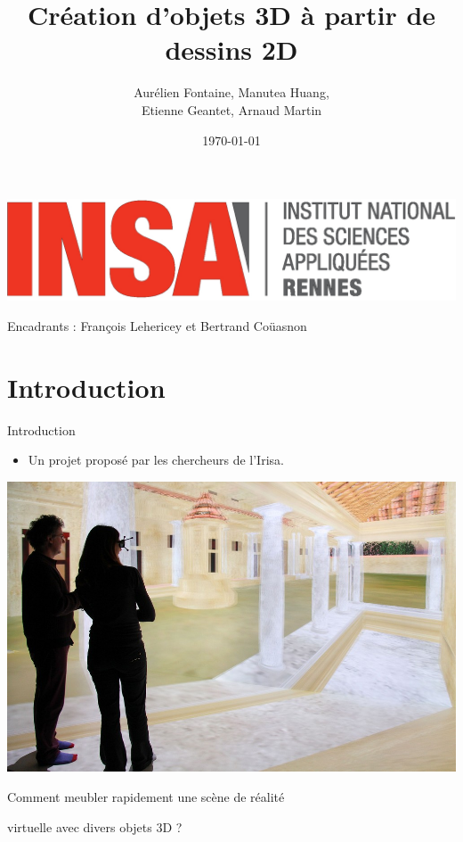 \documentclass[a4paper,10pt]{beamer}
\title{Création d'objets 3D à partir de dessins 2D}
\author[Groupe 3INFO]{Aurélien Fontaine, Manutea Huang,
\\ Etienne Geantet, Arnaud Martin}
\institute[INSA de Rennes]{Institut National des Sciences Appliquées de Rennes}
\date{\today}
\begin{document}
	
	\begin{frame}
		\begin{titlepage}
			\centerline{\includegraphics[scale=0.1]{images/logos/logoINSA.jpg}}
			\centerline{Encadrants : François Lehericey et Bertrand Coüasnon}	
		\end{titlepage}
	\end{frame}
	
	\section{Introduction}
	
	\begin{frame}{Introduction}
		\begin{itemize}
		\item Un projet proposé par les chercheurs de l'Irisa.
		\end{itemize}
		\centerline{\includegraphics[scale=0.25]{images/intro/Immersia.jpg}}
		\centerline{Comment meubler rapidement une scène de réalité}
		\centerline{virtuelle avec divers objets 3D ?}
	\end{frame}
	
\end{document}
